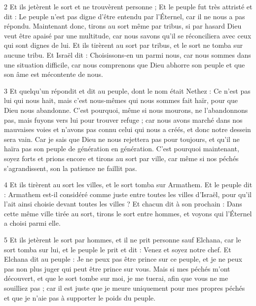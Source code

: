 \par 2 Et ils jetèrent le sort et ne trouvèrent personne ; Et le peuple fut très attristé et dit : Le peuple n'est pas digne d'être entendu par l'Éternel, car il ne nous a pas répondu. Maintenant donc, tirons au sort même par tribus, si par hasard Dieu veut être apaisé par une multitude, car nous savons qu'il se réconciliera avec ceux qui sont dignes de lui. Et ils tirèrent au sort par tribus, et le sort ne tomba sur aucune tribu. Et Israël dit : Choisissons-en un parmi nous, car nous sommes dans une situation difficile, car nous comprenons que Dieu abhorre son peuple et que son âme est mécontente de nous.

\par 3 Et quelqu'un répondit et dit au peuple, dont le nom était Nethez : Ce n'est pas lui qui nous hait, mais c'est nous-mêmes qui nous sommes fait haïr, pour que Dieu nous abandonne. C'est pourquoi, même si nous mourons, ne l'abandonnons pas, mais fuyons vers lui pour trouver refuge ; car nous avons marché dans nos mauvaises voies et n'avons pas connu celui qui nous a créés, et donc notre dessein sera vain. Car je sais que Dieu ne nous rejettera pas pour toujours, et qu'il ne haïra pas son peuple de génération en génération. C'est pourquoi maintenant, soyez forts et prions encore et tirons au sort par ville, car même si nos péchés s'agrandissent, son la patience ne faillit pas.

\par 4 Et ils tirèrent au sort les villes, et le sort tomba sur Armathem. Et le peuple dit : Armathem est-il considéré comme juste entre toutes les villes d'Israël, pour qu'il l'ait ainsi choisie devant toutes les villes ? Et chacun dit à son prochain : Dans cette même ville tirée au sort, tirons le sort entre hommes, et voyons qui l'Éternel a choisi parmi elle.

\par 5 Et ils jetèrent le sort par hommes, et il ne prit personne sauf Elchana, car le sort tomba sur lui, et le peuple le prit et dit : Venez et soyez notre chef. Et Elchana dit au peuple : Je ne peux pas être prince sur ce peuple, et je ne peux pas non plus juger qui peut être prince sur vous. Mais si mes péchés m'ont découvert, et que le sort tombe sur moi, je me tuerai, afin que vous ne me souilliez pas ; car il est juste que je meure uniquement pour mes propres péchés et que je n'aie pas à supporter le poids du peuple.

